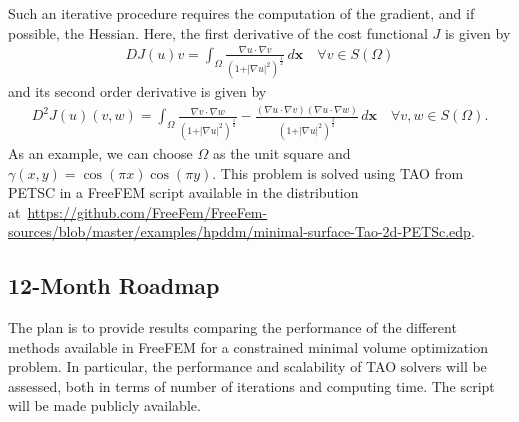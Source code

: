 Such an iterative procedure requires the computation of the gradient, and if possible, the Hessian. Here, the first derivative of the cost functional $J$ is given by
\begin{align}
    \nonumber
	DJ(u)v = \int_{\Omega}  \frac{\nabla u\cdot\nabla v}{(1+\vert\nabla u\vert^2)^{\frac{1}{2}}} \,d\boldsymbol{x} \quad \forall v\in S(\Omega)
\end{align}
and its second order derivative is given by
\begin{align}
    \nonumber
	D^2J(u)(v,w) = \int_{\Omega}  \frac{\nabla v\cdot\nabla w}{(1+\vert\nabla u\vert^2)^{\frac{1}{2}}}  -\frac{(\nabla u \cdot \nabla v)(\nabla u \cdot \nabla w)}{(1+\vert\nabla u\vert^2)^{\frac{3}{2}}} \,d\boldsymbol{x}	\quad \forall v,w \in S(\Omega).
\end{align}	
As an example, we can choose $\Omega$ as the unit square and $\gamma(x,y) = \cos(\pi x)\cos(\pi y)$. This problem is solved using TAO from PETSC in a FreeFEM script available in the distribution at~\url{https://github.com/FreeFem/FreeFem-sources/blob/master/examples/hpddm/minimal-surface-Tao-2d-PETSc.edp}.

\subsection{12-Month Roadmap}
\label{sec:WP5:Freefem++:roadmap}

The plan is to provide results comparing the performance of the different methods available in FreeFEM for a constrained minimal volume optimization problem. In particular, the performance and scalability of TAO solvers will be assessed, both in terms of number of iterations and computing time. The script will be made publicly available.